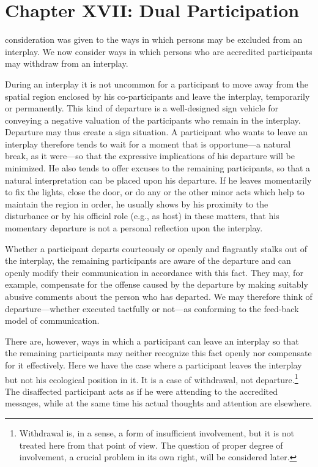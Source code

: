 \documentclass[openany,nobib]{tufte-book}
\let\oldchapter\chapter
\def\chapter{%
  \setcounter{footnote}{0}%
  \oldchapter
}
\begin{document}
\chapter[CHAPTER XVII: DUAL PARTICIPATION]{Chapter XVII: Dual Participation}
\label{ch:Chapter XVII: Dual Participation}

consideration was given to the ways in which
persons may be excluded from an interplay. We now consider ways in which
persons who are accredited participants may withdraw from an interplay.

During an interplay it is not uncommon for a participant to move away
from the spatial region enclosed by his co-participants and leave the
interplay, temporarily or permanently. This kind of departure is a
well-designed sign vehicle for conveying a negative valuation of the
participants who remain in the interplay. Departure may thus create a
sign situation. A participant who wants to leave an interplay therefore
tends to wait for a moment that is opportune---a natural break, as it
were---so that the expressive implications of his departure will be
minimized. He also tends to offer excuses to the remaining participants,
so that a natural interpretation can be placed upon his departure. If he
leaves momentarily to fix the lights, close the door, or do any or the
other minor acts which help to maintain the region in order, he usually
shows by his proximity to the disturbance or by his official role (e.g.,
as host) in these matters, that his momentary departure is not a
personal reflection upon the interplay.

Whether a participant departs courteously or openly and flagrantly
stalks out of the interplay, the remaining participants are aware of the
departure and can openly modify their communication in accordance with
this fact. They may, for example, compensate for the offense caused by
the departure by making suitably abusive comments about the person who
has departed. We may therefore think of departure---whether executed
tactfully or not---as conforming to the feed-back model of
communication.

There are, however, ways in which a participant can leave an interplay
so that the remaining participants may neither recognize this fact
openly nor compensate for it effectively. Here we have the case where a
participant leaves the interplay but not his ecological position in it.
It is a case of withdrawal, not departure.\footnote{Withdrawal is, in a
  sense, a form of insufficient involvement, but it is not treated here
  from that point of view. The question of proper degree of involvement,
  a crucial problem in its own right, will be considered later.} The
disaffected participant acts as if he were attending to the accredited
messages, while at the same time his actual thoughts and attention are
elsewhere.
\end{document}
